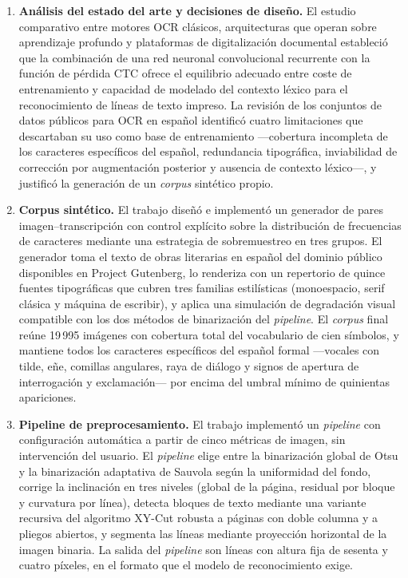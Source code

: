 \begin{enumerate}[leftmargin=*,labelsep=0.5em]
	\item \textbf{Análisis del estado del arte y decisiones de diseño.} El estudio comparativo entre motores OCR clásicos, arquitecturas que operan sobre aprendizaje profundo y plataformas de digitalización documental estableció que la combinación de una red neuronal convolucional recurrente con la función de pérdida CTC ofrece el equilibrio adecuado entre coste de entrenamiento y capacidad de modelado del contexto léxico para el reconocimiento de líneas de texto impreso. La revisión de los conjuntos de datos públicos para OCR en español identificó cuatro limitaciones que descartaban su uso como base de entrenamiento —cobertura incompleta de los caracteres específicos del español, redundancia tipográfica, inviabilidad de corrección por augmentación posterior y ausencia de contexto léxico—, y justificó la generación de un \textit{corpus} sintético propio.
	
	\item \textbf{Corpus sintético.} El trabajo diseñó e implementó un generador de pares imagen--transcripción con control explícito sobre la distribución de frecuencias de caracteres mediante una estrategia de sobremuestreo en tres grupos. El generador toma el texto de obras literarias en español del dominio público disponibles en Project Gutenberg, lo renderiza con un repertorio de quince fuentes tipográficas que cubren tres familias estilísticas (monoespacio, serif clásica y máquina de escribir), y aplica una simulación de degradación visual compatible con los dos métodos de binarización del \textit{pipeline}. El \textit{corpus} final reúne 19\,995 imágenes con cobertura total del vocabulario de cien símbolos, y mantiene todos los caracteres específicos del español formal —vocales con tilde, eñe, comillas angulares, raya de diálogo y signos de apertura de interrogación y exclamación— por encima del umbral mínimo de quinientas apariciones.
	
	\item \textbf{Pipeline de preprocesamiento.} El trabajo implementó un \textit{pipeline} con configuración automática a partir de cinco métricas de imagen, sin intervención del usuario. El \textit{pipeline} elige entre la binarización global de Otsu y la binarización adaptativa de Sauvola según la uniformidad del fondo, corrige la inclinación en tres niveles (global de la página, residual por bloque y curvatura por línea), detecta bloques de texto mediante una variante recursiva del algoritmo XY-Cut robusta a páginas con doble columna y a pliegos abiertos, y segmenta las líneas mediante proyección horizontal de la imagen binaria. La salida del \textit{pipeline} son líneas con altura fija de sesenta y cuatro píxeles, en el formato que el modelo de reconocimiento exige.
	

\end{enumerate}
